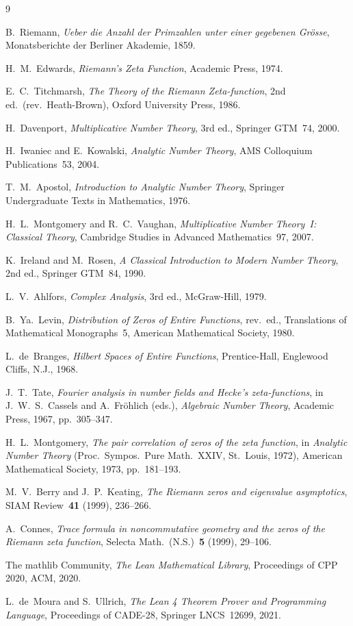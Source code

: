 \documentclass[11pt]{article}
\begin{document}
\begin{thebibliography}{9}

 B.~Riemann,
\emph{Ueber die Anzahl der Primzahlen unter einer gegebenen Gr\"osse},
Monatsberichte der Berliner Akademie, 1859.

 H.~M.~Edwards,
\emph{Riemann's Zeta Function}, Academic Press, 1974.

 E.~C.~Titchmarsh,
\emph{The Theory of the Riemann Zeta-function}, 2nd ed.\ (rev.\ Heath-Brown),
Oxford University Press, 1986.

 H.~Davenport,
\emph{Multiplicative Number Theory}, 3rd ed., Springer GTM~74, 2000.

 H.~Iwaniec and E.~Kowalski,
\emph{Analytic Number Theory}, AMS Colloquium Publications~53, 2004.

 T.~M.~Apostol,
\emph{Introduction to Analytic Number Theory}, Springer Undergraduate Texts in Mathematics, 1976.

 H.~L.~Montgomery and R.~C.~Vaughan,
\emph{Multiplicative Number Theory~I: Classical Theory},
Cambridge Studies in Advanced Mathematics~97, 2007.

 K.~Ireland and M.~Rosen,
\emph{A Classical Introduction to Modern Number Theory}, 2nd ed., Springer GTM~84, 1990.

 L.~V.~Ahlfors,
\emph{Complex Analysis}, 3rd ed., McGraw-Hill, 1979.

 B.~Ya.~Levin,
\emph{Distribution of Zeros of Entire Functions}, rev.\ ed., Translations of Mathematical
Monographs~5, American Mathematical Society, 1980.

 L.~de~Branges,
\emph{Hilbert Spaces of Entire Functions}, Prentice-Hall, Englewood Cliffs, N.J., 1968.

 J.~T.~Tate,
\emph{Fourier analysis in number fields and Hecke's zeta-functions}, in
J.~W.~S.~Cassels and A.~Fr\"ohlich (eds.), \emph{Algebraic Number Theory},
Academic Press, 1967, pp.~305--347.

 H.~L.~Montgomery,
\emph{The pair correlation of zeros of the zeta function}, in \emph{Analytic Number Theory}
(Proc.\ Sympos.\ Pure Math.~XXIV, St.~Louis, 1972), American Mathematical Society, 1973,
pp.~181--193.

 M.~V.~Berry and J.~P.~Keating,
\emph{The Riemann zeros and eigenvalue asymptotics}, SIAM Review~\textbf{41} (1999), 236--266.

 A.~Connes,
\emph{Trace formula in noncommutative geometry and the zeros of the Riemann zeta function},
Selecta Math.\ (N.S.)~\textbf{5} (1999), 29--106.

 The mathlib Community,
\emph{The Lean Mathematical Library},
Proceedings of CPP 2020, ACM, 2020.

 L.~de~Moura and S.~Ullrich,
\emph{The Lean 4 Theorem Prover and Programming Language},
Proceedings of CADE-28, Springer LNCS~12699, 2021.

\end{thebibliography}
\end{document}
